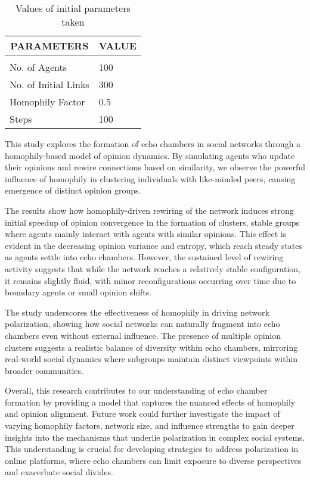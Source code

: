 \documentclass{article} %
\begin{document}
\begin{table}[t]
\caption{Values of initial parameters taken}
\label{sample-table}
\begin{center}
\begin{tabular}{ll}
\multicolumn{1}{c}{\bf PARAMETERS}  &\multicolumn{1}{c}{\bf VALUE}
\\ \hline \\
No. of Agents          &100 \\
No. of Initial Links             &300 \\
Homophily Factor             &0.5 \\
Steps             &100 \\
\end{tabular}
\end{center}
\end{table}

This study explores the formation of echo chambers in social networks through a homophily-based model of opinion dynamics. By simulating agents who update their opinions and rewire connections based on similarity, we observe the powerful influence of homophily in clustering individuals with like-minded peers, causing emergence of distinct opinion groups.

The results show how homophily-driven rewiring of the network induces strong initial speedup of opinion convergence in the formation of clusters, stable groups where agents mainly interact with agents with similar opinions. This effect is evident in the decreasing opinion variance and entropy, which reach steady states as agents settle into echo chambers. However, the sustained level of rewiring activity suggests that while the network reaches a relatively stable configuration, it remains slightly fluid, with minor reconfigurations occurring over time due to boundary agents or small opinion shifts.

The study underscores the effectiveness of homophily in driving network polarization, showing how social networks can naturally fragment into echo chambers even without external influence. The presence of multiple opinion clusters suggests a realistic balance of diversity within echo chambers, mirroring real-world social dynamics where subgroups maintain distinct viewpoints within broader communities.

Overall, this research contributes to our understanding of echo chamber formation by providing a model that captures the nuanced effects of homophily and opinion alignment. Future work could further investigate the impact of varying homophily factors, network size, and influence strengths to gain deeper insights into the mechanisms that underlie polarization in complex social systems. This understanding is crucial for developing strategies to address polarization in online platforms, where echo chambers can limit exposure to diverse perspectives and exacerbate social divides.




\end{document}
